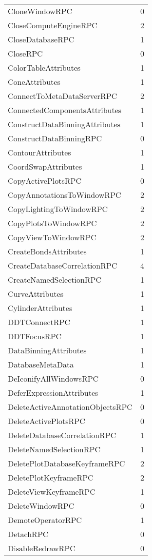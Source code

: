 \documentclass[10pt,a4paper]{report}
\begin{document}
\begin{longtable}{ll}
CloneWindowRPC & 0 \\
CloseComputeEngineRPC & 2 \\
CloseDatabaseRPC & 1 \\
CloseRPC & 0 \\
ColorTableAttributes & 1 \\
ConeAttributes & 1 \\
ConnectToMetaDataServerRPC & 2 \\
ConnectedComponentsAttributes & 1 \\
ConstructDataBinningAttributes & 1 \\
ConstructDataBinningRPC & 0 \\
ContourAttributes & 1 \\
CoordSwapAttributes & 1 \\
CopyActivePlotsRPC & 0 \\
CopyAnnotationsToWindowRPC & 2 \\
CopyLightingToWindowRPC & 2 \\
CopyPlotsToWindowRPC & 2 \\
CopyViewToWindowRPC & 2 \\
CreateBondsAttributes & 1 \\
CreateDatabaseCorrelationRPC & 4 \\
CreateNamedSelectionRPC & 1 \\
CurveAttributes & 1 \\
CylinderAttributes & 1 \\
DDTConnectRPC & 1 \\
DDTFocusRPC & 1 \\
DataBinningAttributes & 1 \\
DatabaseMetaData & 1 \\
DeIconifyAllWindowsRPC & 0 \\
DeferExpressionAttributes & 1 \\
DeleteActiveAnnotationObjectsRPC & 0 \\
DeleteActivePlotsRPC & 0 \\
DeleteDatabaseCorrelationRPC & 1 \\
DeleteNamedSelectionRPC & 1 \\
DeletePlotDatabaseKeyframeRPC & 2 \\
DeletePlotKeyframeRPC & 2 \\
DeleteViewKeyframeRPC & 1 \\
DeleteWindowRPC & 0 \\
DemoteOperatorRPC & 1 \\
DetachRPC & 0 \\
DisableRedrawRPC & 0 \\

\end{longtable}
\end{document}
